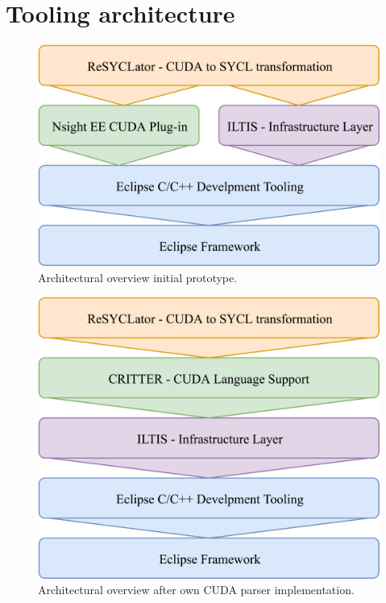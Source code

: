 \documentclass[sigconf]{acmart}
\begin{document}
\section{Tooling architecture}
\begin{figure}[h]
  \label{fig:protoarch}
  \centering
  \includegraphics[width=\linewidth]{SimpleArchitectureNsight}
  \caption{Architectural overview initial prototype.}
\end{figure}
\begin{figure}[h]
  \label{fig:protoarch}
  \centering
  \includegraphics[width=\linewidth]{SimpleArchitectureCRITTER}
  \caption{Architectural overview after own CUDA parser implementation.}
\end{figure}
\end{document}
